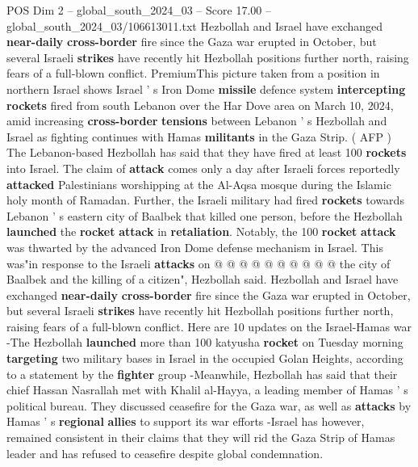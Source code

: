 \begin{textsample}{POS Dim 2 – global\_south\_2024\_03 – Score 17.00 – global\_south\_2024\_03/106613011.txt}  \label{ex:f2_pos_332}
Hezbollah and Israel have exchanged \textbf{near-daily} \textbf{cross-border} fire since the Gaza war erupted in October, but several Israeli \textbf{strikes} have recently hit Hezbollah positions further north, raising fears of a full-blown conflict.
PremiumThis picture taken from a position in northern Israel shows Israel ' s Iron Dome \textbf{missile} defence system \textbf{intercepting} \textbf{rockets} fired from south Lebanon over the Har Dove area on March 10, 2024, amid increasing \textbf{cross-border} \textbf{tensions} between Lebanon ' s Hezbollah and Israel as fighting continues with Hamas \textbf{militants} in the Gaza Strip. ( AFP ) The Lebanon-based Hezbollah has said that they have fired at least 100 \textbf{rockets} into Israel.
The claim of \textbf{attack} comes only a day after Israeli forces reportedly \textbf{attacked} Palestinians worshipping at the Al-Aqsa mosque during the Islamic holy month of Ramadan.
Further, the Israeli military had fired \textbf{rockets} towards Lebanon ' s eastern city of Baalbek that killed one person, before the Hezbollah \textbf{launched} the \textbf{rocket} \textbf{attack} in \textbf{retaliation}.
Notably, the 100 \textbf{rocket} \textbf{attack} was thwarted by the advanced Iron Dome defense mechanism in Israel.
This was"in response to the Israeli \textbf{attacks} on @ @ @ @ @ @ @ @ @ @ the city of Baalbek and the killing of a citizen", Hezbollah said.
Hezbollah and Israel have exchanged \textbf{near-daily} \textbf{cross-border} fire since the Gaza war erupted in October, but several Israeli \textbf{strikes} have recently hit Hezbollah positions further north, raising fears of a full-blown conflict.
Here are 10 updates on the Israel-Hamas war -The Hezbollah \textbf{launched} more than 100 katyusha \textbf{rocket} on Tuesday morning \textbf{targeting} two military bases in Israel in the occupied Golan Heights, according to a statement by the \textbf{fighter} group -Meanwhile, Hezbollah has said that their chief Hassan Nasrallah met with Khalil al-Hayya, a leading member of Hamas ' s political bureau.
They discussed ceasefire for the Gaza war, as well as \textbf{attacks} by Hamas ' s \textbf{regional} \textbf{allies} to support its war efforts -Israel has however, remained consistent in their claims that they will rid the Gaza Strip of Hamas leader and has refused to ceasefire despite global condemnation.

\end{textsample}
